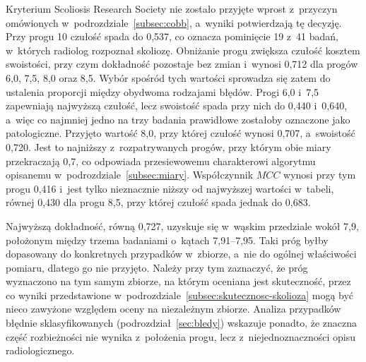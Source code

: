 Kryterium Scoliosis Research Society nie zostało przyjęte wprost z~przyczyn omówionych w~podrozdziale~\ref{subsec:cobb}, a~wyniki potwierdzają tę decyzję.
Przy progu 10\degree{} czułość spada do 0,537, co oznacza pominięcie 19 z~41 badań, w~których radiolog rozpoznał skoliozę.
Obniżanie progu zwiększa czułość kosztem swoistości, przy czym dokładność pozostaje bez zmian i~wynosi 0,712 dla progów 6,0\degree{}, 7,5\degree{}, 8,0\degree{} oraz 8,5\degree{}.
Wybór spośród tych wartości sprowadza się zatem do ustalenia proporcji między obydwoma rodzajami błędów.
Progi 6,0\degree{} i~7,5\degree{} zapewniają najwyższą czułość, lecz swoistość spada przy nich do 0,440 i~0,640, a~więc co najmniej jedno na trzy badania prawidłowe zostałoby oznaczone jako patologiczne.
Przyjęto wartość 8,0\degree{}, przy której czułość wynosi 0,707, a~swoistość 0,720.
Jest to najniższy z~rozpatrywanych progów, przy którym obie miary przekraczają 0,7, co odpowiada przesiewowemu charakterowi algorytmu opisanemu w~podrozdziale~\ref{subsec:miary}.
Współczynnik $MCC$ wynosi przy tym progu 0,416 i~jest tylko nieznacznie niższy od najwyższej wartości w~tabeli, równej 0,430 dla progu 8,5\degree{}, przy której czułość spada jednak do 0,683.

Najwyższą dokładność, równą 0,727, uzyskuje się w~wąskim przedziale wokół 7,9\degree{}, położonym między trzema badaniami o~kątach 7,91--7,95\degree{}.
Taki próg byłby dopasowany do konkretnych przypadków w~zbiorze, a~nie do ogólnej właściwości pomiaru, dlatego go nie przyjęto.
Należy przy tym zaznaczyć, że próg wyznaczono na tym samym zbiorze, na którym oceniana jest skuteczność, przez co wyniki przedstawione w~podrozdziale~\ref{subsec:skutecznosc-skolioza} mogą być nieco zawyżone względem oceny na niezależnym zbiorze.
Analiza przypadków błędnie sklasyfikowanych (podrozdział~\ref{sec:bledy}) wskazuje ponadto, że znaczna część rozbieżności nie wynika z~położenia progu, lecz z~niejednoznaczności opisu radiologicznego.

